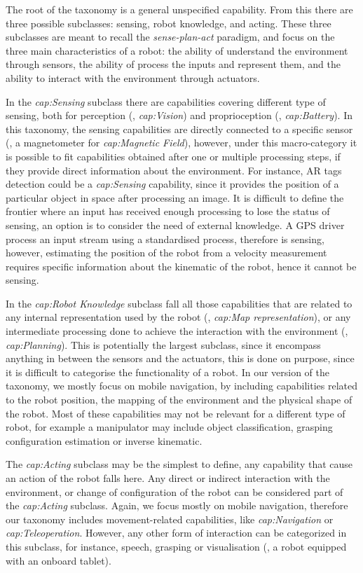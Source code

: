 The root of the taxonomy is a general unspecified capability. From this there are three possible subclasses: sensing, robot knowledge, and acting. These three subclasses are meant to recall the \textit{sense-plan-act} paradigm, and focus on the three main characteristics of a robot: the ability of understand the environment through sensors, the ability of process the inputs and represent them, and the ability to interact with the environment through actuators.

In the \textit{cap:Sensing} subclass there are capabilities covering different type of sensing, both for perception (\eg, \textit{cap:Vision}) and proprioception (\eg, \textit{cap:Battery}). In this taxonomy, the sensing capabilities are directly connected to a specific sensor (\eg, a magnetometer for \textit{cap:Magnetic Field}), however, under this macro-category it is possible to fit capabilities obtained after one or multiple processing steps, if they provide direct information about the environment. For instance, AR tags detection could be a \textit{cap:Sensing} capability, since it provides the position of a particular object in space after processing an image. It is difficult to define the frontier where an input has received enough processing to lose the status of sensing, an option is to consider the need of external knowledge.  A GPS driver process an input stream using a standardised process, therefore is sensing, however, estimating the position of the robot from a velocity measurement requires specific information about the kinematic of the robot, hence it cannot be sensing.

In the \textit{cap:Robot Knowledge} subclass fall all those capabilities that are related to any internal representation used by the robot (\eg, \textit{cap:Map representation}), or any intermediate processing done to achieve the interaction with the environment (\eg, \textit{cap:Planning}). This is potentially the largest subclass, since it encompass anything in between the sensors and the actuators, this is done on purpose, since it is difficult to categorise the functionality of a robot. In our version of the taxonomy, we mostly focus on mobile navigation, by including capabilities related to the robot position, the mapping of the environment and the physical shape of the robot. Most of these capabilities may not be relevant for a different type of robot, for example a manipulator may include object classification, grasping configuration estimation or inverse kinematic.

The \textit{cap:Acting} subclass may be the simplest to define, any capability that cause an action of the robot falls here. Any direct or indirect interaction with the environment, or change of configuration of the robot can be considered part of the \textit{cap:Acting} subclass. Again, we focus mostly on mobile navigation, therefore our taxonomy includes movement-related capabilities, like \textit{cap:Navigation} or \textit{cap:Teleoperation}. However, any other form of interaction can be categorized in this subclass, for instance, speech, grasping or visualisation (\eg, a robot equipped with an onboard tablet).

